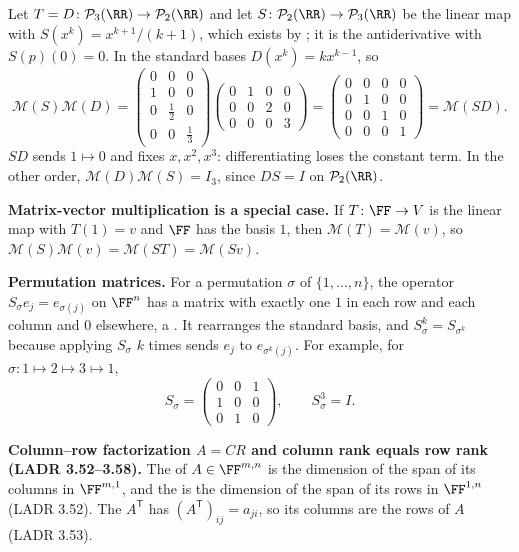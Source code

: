\documentclass[10pt]{scrartcl}
\newcommand{\PP}{\mathcal P}\newcommand{\LL}{\mathcal L}\newcommand{\MM}{\mathcal M}
\begin{document}
\begin{example*}
  Let $T=D\colon\PP_3(\RR)\to\PP_2(\RR)$ and let $S\colon\PP_2(\RR)\to\PP_3(\RR)$ be the linear map with $S(x^k)=x^{k+1}/(k+1)$, which exists by ; it is the antiderivative with $S(p)(0)=0$. In the standard bases $D(x^k)=kx^{k-1}$, so
  \[
    \MM(S)\MM(D)=\begin{pmatrix}0&0&0\\1&0&0\\0&\tfrac12&0\\0&0&\tfrac13\end{pmatrix}\begin{pmatrix}0&1&0&0\\0&0&2&0\\0&0&0&3\end{pmatrix}=\begin{pmatrix}0&0&0&0\\0&1&0&0\\0&0&1&0\\0&0&0&1\end{pmatrix}=\MM(SD).
  \]
  $SD$ sends $1\mapsto0$ and fixes $x,x^2,x^3$: differentiating loses the constant term. In the other order, $\MM(D)\MM(S)=I_3$, since $DS=I$ on $\PP_2(\RR)$.
\end{example*}

\textbf{Matrix-vector multiplication is a special case.} If $T\colon\FF\to V$ is the linear map with $T(1)=v$ and $\FF$ has the basis $1$, then $\MM(T)=\MM(v)$, so $\MM(S)\MM(v)=\MM(ST)=\MM(Sv)$.

\textbf{Permutation matrices.} For a permutation $\sigma$ of $\{1,\dots,n\}$, the operator $S_\sigma e_j=e_{\sigma(j)}$ on $\FF^n$ has a matrix with exactly one $1$ in each row and each column and $0$ elsewhere, a . It rearranges the standard basis, and $S_\sigma^k=S_{\sigma^k}$ because applying $S_\sigma$ $k$ times sends $e_j$ to $e_{\sigma^k(j)}$. For example, for $\sigma\colon1\mapsto2\mapsto3\mapsto1$,
\[
  S_\sigma=\begin{pmatrix}0&0&1\\1&0&0\\0&1&0\end{pmatrix},\qquad S_\sigma^3=I.
\]

\textbf{Column--row factorization $A=CR$ and column rank equals row rank (LADR 3.52--3.58).} The  of $A\in\FF^{m,n}$ is the dimension of the span of its columns in $\FF^{m,1}$, and the  is the dimension of the span of its rows in $\FF^{1,n}$ (LADR 3.52). The  $A^{\mathsf T}$ has $(A^{\mathsf T})_{ij}=a_{ji}$, so its columns are the rows of $A$ (LADR 3.53).
\end{document}

